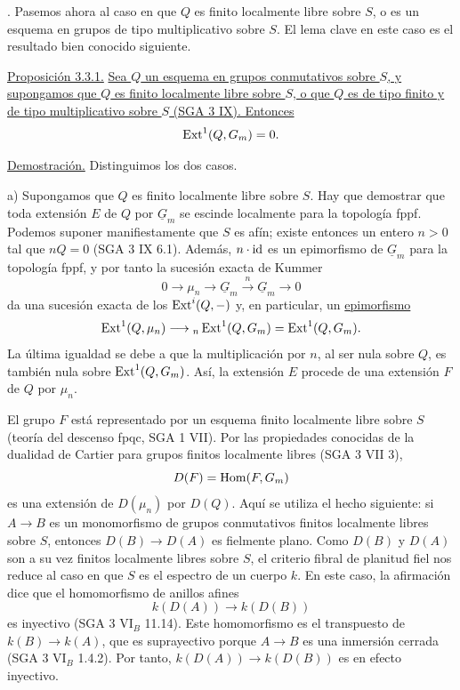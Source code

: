 
\medskip
{}. Pasemos ahora al caso en que $Q$ es finito localmente
libre sobre $S$, o es un esquema en grupos de tipo multiplicativo
sobre $S$. El lema clave en este caso es el resultado bien conocido
siguiente.

\medskip
\noindent\underline{Proposición 3.3.1.} \underline{Sea $Q$ un
esquema en grupos conmutativos sobre $S$, y supongamos que $Q$ es
finito localmente libre sobre $S$, o que $Q$ es de tipo finito y de
tipo multiplicativo sobre $S$ (SGA 3 IX). Entonces}
\[
 \operatorname{Ext}^1(Q,G_m)=0.
\]

\noindent\underline{Demostración.} Distinguimos los dos casos.

\medskip
\noindent a) Supongamos que $Q$ es finito localmente libre sobre $S$.
Hay que demostrar que toda extensión $E$ de $Q$ por $\underline G_m$
se escinde localmente para la topología fppf. Podemos suponer
manifiestamente que $S$ es afín; existe entonces un entero $n>0$ tal
que $nQ=0$ (SGA 3 IX 6.1). Además, $n\cdot\mathrm{id}$ es un epimorfismo de
$\underline G_m$ para la topología fppf, y por tanto la sucesión
exacta de Kummer
\[
 0\longrightarrow\mu_n\longrightarrow\underline G_m
 \xrightarrow{\ n\ }\underline G_m\longrightarrow0
\]
da una sucesión exacta de los $\operatorname{Ext}^i(Q,-)$ y, en particular, un
\underline{epimorfismo}
\[
 \operatorname{Ext}^1(Q,\mu_n)\longrightarrow
 {}_n\operatorname{Ext}^1(Q,G_m)=\operatorname{Ext}^1(Q,G_m).
\]
La última igualdad se debe a que la multiplicación por $n$, al ser
nula sobre $Q$, es también nula sobre $\operatorname{Ext}^1(Q,G_m)$.
Así, la extensión $E$ procede de una extensión $F$ de $Q$ por
$\mu_n$.


El grupo $F$ está representado por un esquema finito localmente libre
sobre $S$ (teoría del descenso fpqc, SGA 1 VII). Por las propiedades
conocidas de la dualidad de Cartier para grupos finitos localmente
libres (SGA 3 VII 3),
\[
 D(F)=\operatorname{Hom}(F,G_m)
\]
es una extensión de $D(\mu_n)$ por $D(Q)$. Aquí se utiliza el hecho
siguiente: si $A\longrightarrow B$ es un monomorfismo de grupos
conmutativos finitos localmente libres sobre $S$, entonces
$D(B)\longrightarrow D(A)$ es fielmente plano. Como $D(B)$ y $D(A)$
son a su vez finitos localmente libres sobre $S$, el criterio fibral
de planitud fiel nos reduce al caso en que $S$ es el espectro de un
cuerpo $k$. En este caso, la afirmación dice que el homomorfismo de
anillos afines
\[
 k(D(A))\longrightarrow k(D(B))
\]
es inyectivo (SGA 3 $\mathrm{VI}_B$ 11.14). Este homomorfismo es el
transpuesto de $k(B)\longrightarrow k(A)$, que es suprayectivo porque
$A\longrightarrow B$ es una inmersión cerrada (SGA 3 $\mathrm{VI}_B$
1.4.2). Por tanto, $k(D(A))\longrightarrow k(D(B))$ es en efecto
inyectivo.

